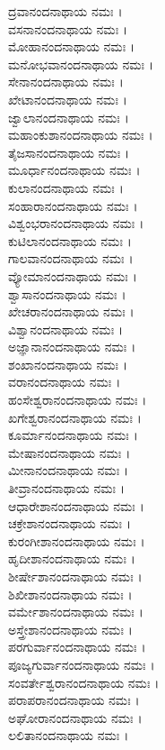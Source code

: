 ದ್ರವಾನಂದನಾಥಾಯ ನಮಃ ।\\
ವಸನಾನಂದನಾಥಾಯ ನಮಃ ।\\
ಮೋಹಾನಂದನಾಥಾಯ ನಮಃ ।\\
ಮನೋಭವಾನಂದನಾಥಾಯ ನಮಃ ।\\
ಸೇನಾನಂದನಾಥಾಯ ನಮಃ ।\\
ಖೇಟಾನಂದನಾಥಾಯ ನಮಃ ।\\
ಜ್ವಾಲಾನಂದನಾಥಾಯ ನಮಃ ।\\
ಮಹಾಂಕುಶಾನಂದನಾಥಾಯ ನಮಃ ।\\
ತೈಜಸಾನಂದನಾಥಾಯ ನಮಃ ।\\
ಮೂರ್ಧಾನಂದನಾಥಾಯ ನಮಃ ।\\
ಕುಲಾನಂದನಾಥಾಯ ನಮಃ ।\\
ಸಂಹಾರಾನಂದನಾಥಾಯ ನಮಃ ।\\
ವಿಶ್ವಂಭರಾನಂದನಾಥಾಯ ನಮಃ ।\\
ಕುಟಿಲಾನಂದನಾಥಾಯ ನಮಃ ।\\
ಗಾಲವಾನಂದನಾಥಾಯ ನಮಃ ।\\
ವ್ಯೋಮಾನಂದನಾಥಾಯ ನಮಃ ।\\
ಶ್ವಾಸಾನಂದನಾಥಾಯ ನಮಃ ।\\
ಖೇಚರಾನಂದನಾಥಾಯ ನಮಃ ।\\
ವಿಶ್ವಾನಂದನಾಥಾಯ ನಮಃ ।\\
ಅಜ್ಞಾನಾನಂದನಾಥಾಯ ನಮಃ ।\\
ಶಂಖಾನಂದನಾಥಾಯ ನಮಃ ।\\
ವರಾನಂದನಾಥಾಯ ನಮಃ ।\\
ಹಂಸೇಶ್ವರಾನಂದನಾಥಾಯ ನಮಃ ।\\
ಖಗೇಶ್ವರಾನಂದನಾಥಾಯ ನಮಃ ।\\
ಕೂರ್ಮಾನಂದನಾಥಾಯ ನಮಃ ।\\
ಮೇಷಾನಂದನಾಥಾಯ ನಮಃ ।\\
ಮೀನಾನಂದನಾಥಾಯ ನಮಃ ।\\
ತೀವ್ರಾನಂದನಾಥಾಯ ನಮಃ ।\\
ಆಧಾರೇಶಾನಂದನಾಥಾಯ ನಮಃ ।\\
ಚಕ್ರೇಶಾನಂದನಾಥಾಯ ನಮಃ ।\\
ಕುರಂಗೀಶಾನಂದನಾಥಾಯ ನಮಃ ।\\
ಹೃದೀಶಾನಂದನಾಥಾಯ ನಮಃ ।\\
ಶೀರ್ಷೇಶಾನಂದನಾಥಾಯ ನಮಃ ।\\
ಶಿಖೀಶಾನಂದನಾಥಾಯ ನಮಃ ।\\
ವರ್ಮೇಶಾನಂದನಾಥಾಯ ನಮಃ ।\\
ಅಸ್ತ್ರೇಶಾನಂದನಾಥಾಯ ನಮಃ ।\\
ಪರಗುರ್ವಾನಂದನಾಥಾಯ ನಮಃ ।\\
ಪೂಜ್ಯಗುರ್ವಾನಂದನಾಥಾಯ ನಮಃ ।\\
ಸಂವರ್ತೇಶ್ವರಾನಂದನಾಥಾಯ ನಮಃ ।\\
ಪರಾಪರಾನಂದನಾಥಾಯ ನಮಃ ।\\
ಅಘೋರಾನಂದನಾಥಾಯ ನಮಃ ।\\
ಲಲಿತಾನಂದನಾಥಾಯ ನಮಃ ।\\
